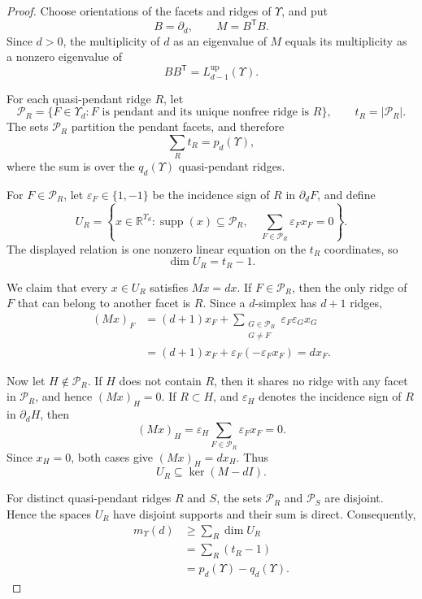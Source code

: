 \documentclass[12pt]{article}
\theoremstyle{remark}
\newcommand{\R}{\mathbb{R}}
\begin{document}
\begin{proof}
Choose orientations of the facets and ridges of $\Upsilon$, and put
\[
B=\partial_d,\qquad M=B^{\mathsf T}B.
\]
Since $d>0$, the multiplicity of $d$ as an eigenvalue of $M$ equals its multiplicity as a nonzero eigenvalue of
\[
BB^{\mathsf T}=L_{d-1}^{\mathrm{up}}(\Upsilon).
\]

For each quasi-pendant ridge $R$, let
\[
\mathcal P_R
=\{F\in\Upsilon_d:F\text{ is pendant and its unique nonfree ridge is }R\},
\qquad
t_R=|\mathcal P_R|.
\]
The sets $\mathcal P_R$ partition the pendant facets, and therefore
\[
\sum_R t_R=p_d(\Upsilon),
\]
where the sum is over the $q_d(\Upsilon)$ quasi-pendant ridges.

For $F\in\mathcal P_R$, let $\varepsilon_F\in\{1,-1\}$ be the incidence sign of $R$ in $\partial_dF$, and define
\[
U_R=
\left\{
x\in\R^{\Upsilon_d}:
\operatorname{supp}(x)\subseteq\mathcal P_R,\quad
\sum_{F\in\mathcal P_R}\varepsilon_Fx_F=0
\right\}.
\]
The displayed relation is one nonzero linear equation on the $t_R$ coordinates, so
\[
\dim U_R=t_R-1.
\]

We claim that every $x\in U_R$ satisfies $Mx=dx$.  If $F\in\mathcal P_R$, then the only ridge of $F$ that can belong to another facet is $R$.  Since a $d$-simplex has $d+1$ ridges,
\[
\begin{aligned}
(Mx)_F
&=(d+1)x_F+
\sum_{\substack{G\in\mathcal P_R\\G\ne F}}
\varepsilon_F\varepsilon_Gx_G\\
&=(d+1)x_F+
\varepsilon_F\left(-\varepsilon_Fx_F\right)
=dx_F.
\end{aligned}
\]

Now let $H\notin\mathcal P_R$.  If $H$ does not contain $R$, then it shares no ridge with any facet in $\mathcal P_R$, and hence $(Mx)_H=0$.  If $R\subset H$, and $\varepsilon_H$ denotes the incidence sign of $R$ in $\partial_dH$, then
\[
(Mx)_H
=\varepsilon_H\sum_{F\in\mathcal P_R}\varepsilon_Fx_F
=0.
\]
Since $x_H=0$, both cases give $(Mx)_H=dx_H$.  Thus
\[
U_R\subseteq\ker(M-dI).
\]

For distinct quasi-pendant ridges $R$ and $S$, the sets $\mathcal P_R$ and $\mathcal P_S$ are disjoint.  Hence the spaces $U_R$ have disjoint supports and their sum is direct.  Consequently,
\[
\begin{aligned}
m_{\Upsilon}(d)
&\ge\sum_R\dim U_R\\
&=\sum_R(t_R-1)\\
&=p_d(\Upsilon)-q_d(\Upsilon).
\end{aligned}
\]
\end{proof}
\end{document}
